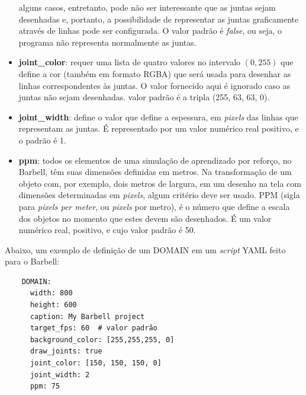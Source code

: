 \documentclass[cic,tc]{iiufrgs}
\begin{document}
\begin{itemize}
      alguns casos, entretanto, pode não ser interessante que as juntas sejam desenhadas e, portanto, a possibilidade de representar as juntas graficamente através
      de linhas pode ser configurada. O valor padrão é \textit{false}, ou seja, o programa não representa normalmente as juntas.
      \item \textbf{joint\_color}: requer uma lista de quatro valores no intervalo $(0, 255)$ que define a cor (também em formato RGBA) que será usada para desenhar as linhas correspondentes
      às juntas. O valor fornecido aqui é ignorado caso as juntas não sejam desenhadas. valor padrão é a tripla (255, 63, 63, 0).
      \item \textbf{joint\_width}: define o valor que define a espessura, em \textit{pixels} das linhas que representam as juntas. É representado por um valor numérico real positivo, e o
      padrão é 1.
      \item \textbf{ppm}: todos os elementos de uma simulação de aprendizado por reforço, no Barbell, têm suas dimensões definidas em metros. Na transformação de um objeto com,
      por exemplo, dois metros de largura, em um desenho na tela com dimensões determinadas em \textit{pixels}, algum critério deve ser usado. PPM (sigla para
      \textit{pixels per meter}, ou \textit{pixels} por metro), é o número que define a escala dos objetos no momento que estes devem são desenhados. É um valor numérico
      real, positivo, e cujo valor padrão é 50.
    \end{itemize}
    
    
    Abaixo, um exemplo de definição de um DOMAIN em um \textit{script} YAML feito para o Barbell:
    \begin{verbatim}
    DOMAIN:
      width: 800
      height: 600
      caption: My Barbell project
      target_fps: 60  # valor padrão
      background_color: [255,255,255, 0]
      draw_joints: true
      joint_color: [150, 150, 150, 0]
      joint_width: 2
      ppm: 75
    \end{verbatim}
\end{document}

